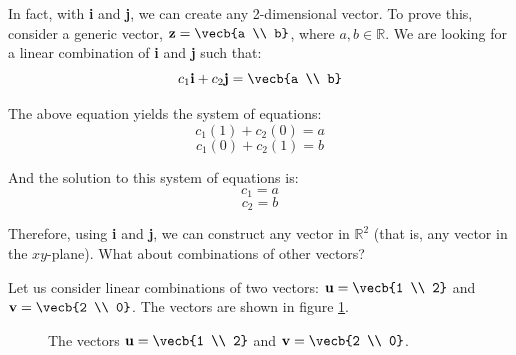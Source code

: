 In fact, with \textbf{i} and \textbf{j}, we can create any 2-dimensional 
vector. To prove this, consider a generic vector, $\textbf{z} = \vecb{a \\ b}$, where $a, b \in \mathbb{R}$. We are looking for a linear combination 
of \textbf{i} and \textbf{j} such that:
$$c_1 \textbf{i} + c_2 \textbf{j} = \vecb{a \\ b}$$

The above equation yields the system of equations:
$$c_1 \left( 1 \right) + c_2 \left( 0 \right) = a$$
$$c_1 \left( 0 \right) + c_2 \left( 1 \right) = b$$

And the solution to this system of equations is:
$$c_1 = a$$
$$c_2 = b$$

Therefore, using \textbf{i} and \textbf{j}, we can construct any vector in 
$\mathbb{R}^2$ (that is, any vector in the $xy$-plane). What about combinations 
of other vectors?

Let us consider linear combinations of two vectors: $\textbf{u} = \vecb{1 \\ 2}$ and $\textbf{v} = \vecb{2 \\ 0}$. The vectors are shown in 
figure \ref{fig:u_and_v}. 

\begin{figure}[H]
    \centering
    \caption{The vectors $\textbf{u} = \vecb{1 \\ 2}$ and $\textbf{v} = 
    \vecb{2 \\ 0}$.}
    \label{fig:u_and_v}
\end{figure}


